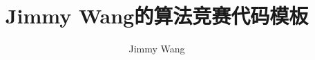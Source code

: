 \documentclass[UTF8,11pt,a4paper]{ctexart}%
\title{Jimmy Wang的算法竞赛代码模板}
\author{Jimmy Wang}
\begin{document}
\begin{sloppypar} %
    \maketitle
    \tableofcontents
    

\end{sloppypar} %
\end{document}
